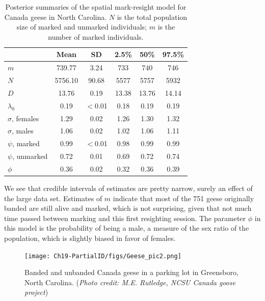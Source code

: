 \begin{table}
\label{partialID.tab.geese}
\centering
  \caption{Posterior summaries of the spatial mark-resight model for Canada geese in North Carolina. $N$ is the total population size of marked and unmarked individuals; $m$ is the number of marked individuals.}
  \begin{tabular}{lccccc}
             \hline
                  & Mean    & SD      & 2.5\% & 50\%  & 97.5\% \\
           \hline
$m$               & 739.77  & 3.24    & 733   & 740   & 746    \\
$N$               & 5756.10 & 90.68   & 5577  & 5757  & 5932   \\
$D$               & 13.76   & 0.19    & 13.38 & 13.76 & 14.14  \\
$\lambda_0$       & 0.19    & $<$0.01 & 0.18  & 0.19  & 0.19   \\
$\sigma$, females & 1.29    & 0.02    & 1.26  & 1.30  & 1.32   \\
$\sigma$, males   & 1.06    & 0.02    & 1.02  & 1.06  & 1.11   \\
$\psi$, marked    & 0.99    & $<$0.01 & 0.98  & 0.99  & 0.99   \\
$\psi$, unmarked  & 0.72    & 0.01    & 0.69  & 0.72  & 0.74   \\
$\phi$            & 0.36    & 0.02    & 0.32  & 0.36  & 0.39   \\
    \hline
  \end{tabular}
\end{table}

We see that credible intervals of estimates are pretty narrow, surely an effect of the large data set. Estimates of $m$ indicate that most of the 751 geese originally banded are still alive and marked, which is not surprising, given that not much time passed between marking and this first resighting session. The parameter $\phi$ in this model is the probability of being a male, a measure of the sex ratio of the population, which is slightly biased in favor of females.

\begin{figure}[ht]
  \centering
  \texttt{[image: Ch19-PartialID/figs/Geese\_pic2.png]}
  \caption{Banded and unbanded Canada geese in a parking lot in Greensboro, North Carolina.
({\it Photo credit: M.E. Rutledge, NCSU Canada goose project})}
  \label{partialID.fig.geese}
\end{figure}

